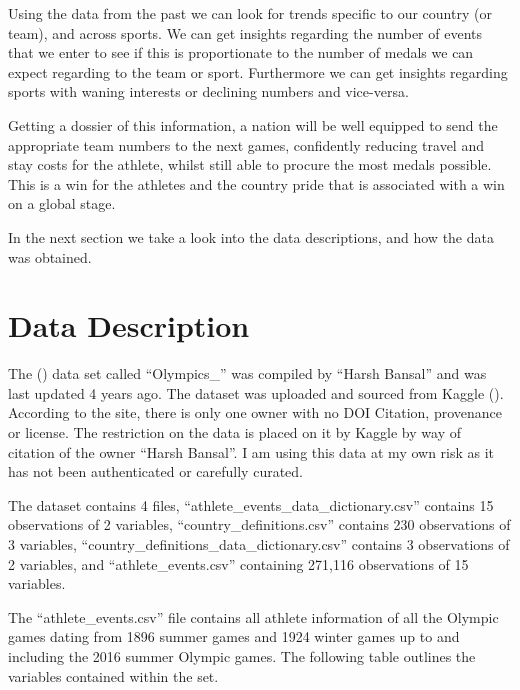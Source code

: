 \documentclass[
]{article}
\begin{document}
Using the data from the past we can look for trends specific to our country (or team), and across sports. We can get insights regarding the number of events that we enter to see if this is proportionate to the number of medals we can expect regarding to the team or sport. Furthermore we can get insights regarding sports with waning interests or declining numbers and vice-versa.

Getting a dossier of this information, a nation will be well equipped to send the appropriate team numbers to the next games, confidently reducing travel and stay costs for the athlete, whilst still able to procure the most medals possible. This is a win for the athletes and the country pride that is associated with a win on a global stage.

In the next section we take a look into the data descriptions, and how the data was obtained.

\newpage

\section*{Data Description}\label{data-description}

The () data set called ``Olympics\_'' was compiled by ``Harsh Bansal'' and was last updated 4 years ago. The dataset was uploaded and sourced from Kaggle (). According to the site, there is only one owner with no DOI Citation, provenance or license. The restriction on the data is placed on it by Kaggle by way of citation of the owner ``Harsh Bansal''. I am using this data at my own risk as it has not been authenticated or carefully curated.

The dataset contains 4 files, ``athlete\_events\_data\_dictionary.csv'' contains 15 observations of 2 variables, ``country\_definitions.csv'' contains 230 observations of 3 variables, ``country\_definitions\_data\_dictionary.csv'' contains 3 observations of 2 variables, and ``athlete\_events.csv'' containing 271,116 observations of 15 variables.

The ``athlete\_events.csv'' file contains all athlete information of all the Olympic games dating from 1896 summer games and 1924 winter games up to and including the 2016 summer Olympic games. The following table outlines the variables contained within the set.
\end{document}
